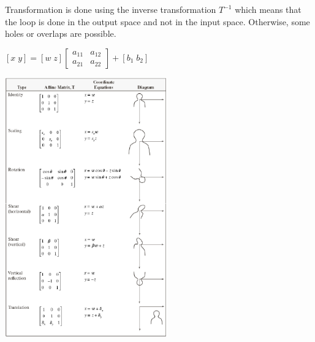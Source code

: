Transformation is done using the inverse transformation $T^{-1}$ which means that the loop is done 
in the output space and not in the input space. Otherwise, some holes or overlaps are possible.

\begin{minipage}{9cm}
  $[x \; y] = [w \; z] \begin{bmatrix}
  a_{11} &a_{12} \\ a_{21} &a_{22}
  \end{bmatrix} + [b_1 \; b_2]$
  
  \includegraphics[width=7cm]{./images/affine_transformations.png}
\end{minipage}
